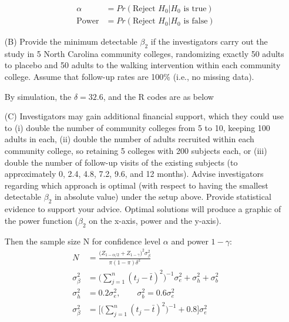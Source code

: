 \begin{itemize}
\begin{align*}
\alpha &= Pr(\text{Reject } H_0 | H_0 \text{ is true} ) \\ 
\text{Power} &= Pr(\text{Reject } H_0 | H_0 \text{ is false})
\end{align*}




								\vspace{0.2cm} 
								\item[(B)] Provide the minimum detectable $\beta_2$ if the investigators carry out the study in 5 North Carolina community colleges, randomizing exactly
													 50 adults to placebo and 50 adults to the walking intervention within each community college. Assume that follow-up rates are 100\% (i.e., no missing data).


By simulation, the $\delta = 32.6$, and the R codes are as below



								\vspace{0.2cm} 
								\item[(C)] Investigators may gain additional financial support, which they could use to (i) double the number of community colleges from 5 to 10, keeping 100 adults in 
													 each, (ii) double the number of adults recruited within each community college, so retaining 5 colleges with 200 subjects each, or (iii) double the number of 
													 follow-up visits of the existing subjects (to approximately 0, 2.4, 4.8, 7.2, 9.6, and 12 months). Advise investigators regarding which approach is optimal 
													 (with respect to having the smallest detectable $\beta_2$ in absolute value) under the setup above. Provide statistical evidence to support your advice. Optimal
													 solutions will produce a graphic of the power function ($\beta_2$ on the x-axis, power and the y-axis).


Then the sample size N for confidence level $\alpha$ and power $1- \gamma$:
\begin{align*}
N &= \frac{\big(Z_{1-\alpha/2} + Z_{1-\gamma}\big)^2 \sigma_{\beta}^2}{\pi (1- \pi) \delta^2}\\
\sigma_{\beta}^2 &= \big( \sum_{j=1}^n (t_j - \bar{t})^2 \big)^{-1} \sigma_e^2 + \sigma_h^2 + \sigma_b^2 \\
\sigma_h^2 &= 0.2 \sigma_e^2, \qquad \sigma_b^2 = 0.6 \sigma_e^2 \\
\sigma_{\beta}^2 &=\big[ \big( \sum_{j=1}^n (t_j - \bar{t})^2 \big)^{-1} + 0.8 \big ] \sigma_e^2 
\end{align*}


\end{itemize}

